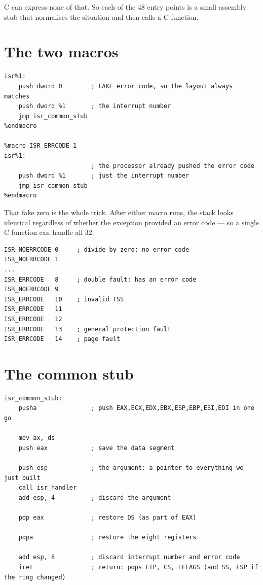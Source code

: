 C can express none of that. So each of the 48 entry points is a small assembly stub that normalises
the situation and then calls a C function.

\section{The two macros}

\begin{lstlisting}[style=asm]
%macro ISR_NOERRCODE 1
isr%1:
    push dword 0        ; FAKE error code, so the layout always matches
    push dword %1       ; the interrupt number
    jmp isr_common_stub
%endmacro

%macro ISR_ERRCODE 1
isr%1:
                        ; the processor already pushed the error code
    push dword %1       ; just the interrupt number
    jmp isr_common_stub
%endmacro
\end{lstlisting}

That fake zero is the whole trick. After either macro runs, the stack looks identical regardless of
whether the exception provided an error code --- so a single C function can handle all 32.

\begin{lstlisting}[style=asm]
ISR_NOERRCODE 0     ; divide by zero: no error code
ISR_NOERRCODE 1
...
ISR_ERRCODE   8     ; double fault: has an error code
ISR_NOERRCODE 9
ISR_ERRCODE   10    ; invalid TSS
ISR_ERRCODE   11
ISR_ERRCODE   12
ISR_ERRCODE   13    ; general protection fault
ISR_ERRCODE   14    ; page fault
\end{lstlisting}

\section{The common stub}

\begin{lstlisting}[style=asm]
isr_common_stub:
    pusha               ; push EAX,ECX,EDX,EBX,ESP,EBP,ESI,EDI in one go

    mov ax, ds
    push eax            ; save the data segment

    push esp            ; the argument: a pointer to everything we just built
    call isr_handler
    add esp, 4          ; discard the argument

    pop eax             ; restore DS (as part of EAX)

    popa                ; restore the eight registers

    add esp, 8          ; discard interrupt number and error code
    iret                ; return: pops EIP, CS, EFLAGS (and SS, ESP if the ring changed)
\end{lstlisting}

